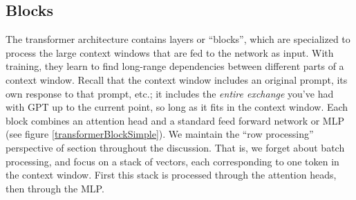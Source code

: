 \subsection{Blocks}

The transformer architecture \cite{vaswani2017attention} contains layers or ``blocks'', which are specialized to process the large context windows that are fed to the network as input. With training, they learn to find long-range dependencies between different parts of a context window. Recall that the context window  includes an original prompt, its own response to that prompt, etc.; it includes the \emph{entire exchange} you've had with GPT up to the current point, so long as it fits in the context window. Each block combines an attention head and a standard feed forward network or MLP (see figure \ref{transformerBlockSimple}). We maintain the ``row processing'' perspective of section  throughout the discussion. That is, we forget about batch processing, and focus on a stack of vectors, each corresponding to one token in the context window. First this stack is processed through the attention heads, then through the MLP.  

